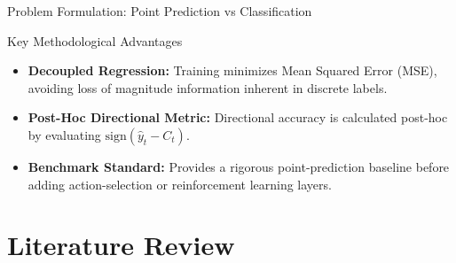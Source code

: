 \documentclass[aspectratio=169]{beamer}
\begin{document}
\begin{frame}{Problem Formulation: Point Prediction vs Classification}

	\begin{block}{Key Methodological Advantages}
		\begin{itemize}
			\item \textbf{Decoupled Regression:} Training minimizes Mean Squared Error (MSE), avoiding loss of magnitude information inherent in discrete labels.
			\item \textbf{Post-Hoc Directional Metric:} Directional accuracy is calculated post-hoc by evaluating $\text{sign}(\hat{y}_t - C_t)$.
			\item \textbf{Benchmark Standard:} Provides a rigorous point-prediction baseline before adding action-selection or reinforcement learning layers.
		\end{itemize}
	\end{block}
\end{frame}

\section{Literature Review}
\subsection*{}
\end{document}
